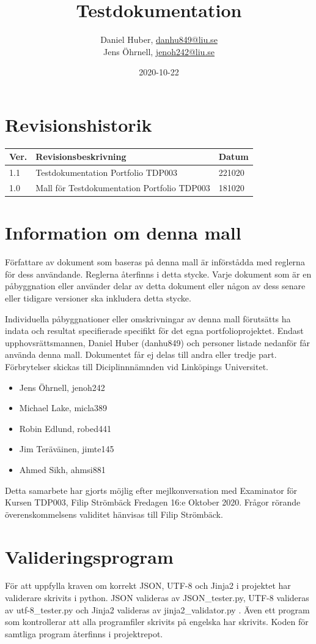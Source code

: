 \documentclass{TDP003mall}
\author{Daniel Huber, \url{danhu849@liu.se}\\
  Jens Öhrnell, \url{jenoh242@liu.se}}
\title{Testdokumentation}
\date{2020-10-22}
\begin{document}
\projectpage
\tableofcontents
\section{Revisionshistorik}
\begin{table}[!h]
\begin{tabularx}{\linewidth}{|l|X|l|}
\hline
Ver. & Revisionsbeskrivning & Datum \\\hline
1.1 & Testdokumentation Portfolio TDP003 & 221020 \\\hline
1.0 & Mall för Testdokumentation Portfolio TDP003 & 181020 \\\hline
\end{tabularx}
\end{table}

\section{Information om denna mall}
Författare av dokument som baseras på denna mall är införstådda med reglerna för dess användande. Reglerna återfinns i detta stycke. Varje dokument som är en påbyggnation eller använder delar av detta dokument eller någon av dess senare eller tidigare versioner ska inkludera detta stycke.

Individuella påbyggnationer eller omskrivningar av denna mall förutsätts ha indata och resultat specifierade specifikt för det egna portfolioprojektet. Endast upphovsrättsmannen, Daniel Huber (danhu849) och personer listade nedanför får använda denna mall. Dokumentet får ej delas till andra eller tredje part. Förbrytelser skickas till Diciplinnnämnden vid Linköpings Universitet.
\begin{itemize}
\item Jens Öhrnell, jenoh242
\item Michael Lake, micla389
\item Robin Edlund, robed441
\item Jim Teräväinen, jimte145
\item Ahmed Sikh, ahmsi881
\end{itemize}

Detta samarbete har gjorts möjlig efter mejlkonversation med Examinator för Kursen TDP003, Filip Strömbäck Fredagen 16:e Oktober 2020. Frågor rörande överenskommelsens validitet hänvisas till Filip Strömbäck.

\section{Valideringsprogram}
För att uppfylla kraven om korrekt JSON, UTF-8 och Jinja2 i projektet har validerare skrivits i python. JSON valideras av JSON\_tester.py, UTF-8 valideras av utf-8\_tester.py och Jinja2 valideras av jinja2\_validator.py . Även ett program som kontrollerar att alla programfiler skrivits på engelska har skrivits. Koden för samtliga program återfinns i projektrepot.  
\end{document}
